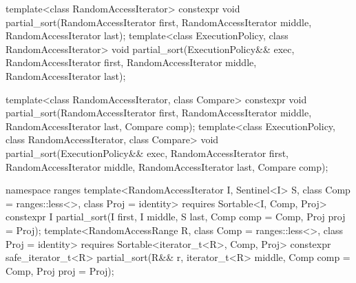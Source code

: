 %
\begin{itemdecl}
template<class RandomAccessIterator>
  constexpr void partial_sort(RandomAccessIterator first,
                              RandomAccessIterator middle,
                              RandomAccessIterator last);
template<class ExecutionPolicy, class RandomAccessIterator>
  void partial_sort(ExecutionPolicy&& exec,
                    RandomAccessIterator first,
                    RandomAccessIterator middle,
                    RandomAccessIterator last);

template<class RandomAccessIterator, class Compare>
  constexpr void partial_sort(RandomAccessIterator first,
                              RandomAccessIterator middle,
                              RandomAccessIterator last,
                              Compare comp);
template<class ExecutionPolicy, class RandomAccessIterator, class Compare>
  void partial_sort(ExecutionPolicy&& exec,
                    RandomAccessIterator first,
                    RandomAccessIterator middle,
                    RandomAccessIterator last,
                    Compare comp);
\end{itemdecl}
\begin{addedblock}
\begin{itemdecl}
namespace ranges {
  template<RandomAccessIterator I, Sentinel<I> S, class Comp = ranges::less<>,
      class Proj = identity>
    requires Sortable<I, Comp, Proj>
    constexpr I
      partial_sort(I first, I middle, S last, Comp comp = Comp{}, Proj proj = Proj{});
  template<RandomAccessRange R, class Comp = ranges::less<>, class Proj = identity>
    requires Sortable<iterator_t<R>, Comp, Proj>
    constexpr safe_iterator_t<R>
      partial_sort(R&& r, iterator_t<R> middle, Comp comp = Comp{},
                   Proj proj = Proj{});
}
\end{itemdecl}
\end{addedblock}

